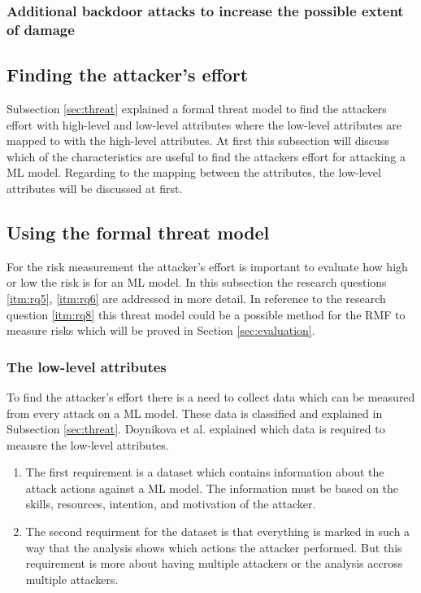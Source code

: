 \subsubsection*{Additional backdoor attacks to increase the possible extent of damage}


\subsection{Finding the attacker's effort}

Subsection \ref{sec:threat} explained a formal threat model to find the attackers effort with high-level and low-level attributes where the low-level attributes are mapped to with the high-level attributes. At first this subsection will discuss which of the characteristics are useful to find the attackers effort for attacking a ML model. Regarding to the mapping between the attributes, the low-level attributes will be discussed at first.

\subsection{Using the formal threat model}

For the risk measurement the attacker's effort is important to evaluate how high or low the risk is for an ML model. In this subsection the research questions \ref{itm:rq5}, \ref{itm:rq6} are addressed in more detail. In reference to the research question \ref{itm:rq8} this threat model could be a possible method for the RMF to measure risks which will be proved in Section \ref{sec:evaluation}.

\subsubsection*{The low-level attributes}

To find the attacker's effort there is a need to collect data which can be measured from every attack on a ML model. These data is classified and explained in Subsection \ref{sec:threat}. Doynikova et al. explained which data is required to meausre the low-level attributes.

\begin{enumerate}
  \item The first requirement is a dataset which contains information about the attack actions against a ML model. The information must be based on the skills, resources, intention, and motivation of the attacker.
  \item The second requirment for the dataset is that everything is marked in such a way that the analysis shows which actions the attacker performed. But this requirement is more about having multiple attackers or the analysis accross multiple attackers.
\end{enumerate}


